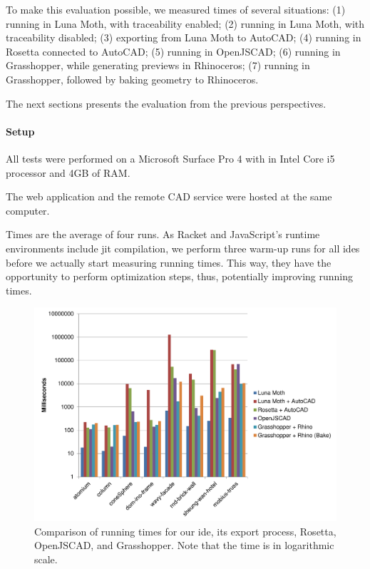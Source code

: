 To make this evaluation possible, we measured times of several situations:
(1) running in Luna Moth, with traceability enabled;
(2) running in Luna Moth, with traceability disabled;
(3) exporting from Luna Moth to AutoCAD;
(4) running in Rosetta connected to AutoCAD;
(5) running in OpenJSCAD;
(6) running in Grasshopper, while generating previews in Rhinoceros;
(7) running in Grasshopper, followed by baking geometry to Rhinoceros.

The next sections presents the evaluation from the previous perspectives.

\paragraph{Setup}
All tests were performed on a Microsoft Surface Pro 4 with in Intel Core i5 processor and 4GB of RAM.

The web application and the remote CAD service were hosted at the same computer.

Times are the average of four runs.
As Racket and JavaScript's runtime environments include \gls{jit} compilation, we perform three warm-up runs for all \glspl{ide} before we actually start measuring running times.
This way, they have the opportunity to perform optimization steps, thus, potentially improving running times.

\begin{figure}
  \centering
  \includegraphics[width=1.0\textwidth]{./images/run_export_rosetta_times}
  \caption[Comparison of running times for our \gls{ide}, its export process, Rosetta, OpenJSCAD, and Grasshopper.]{Comparison of running times for our \gls{ide}, its export process, Rosetta, OpenJSCAD, and Grasshopper. Note that the time is in logarithmic scale.}
  \label{fig:run:export:rosetta:chart}
\end{figure}


